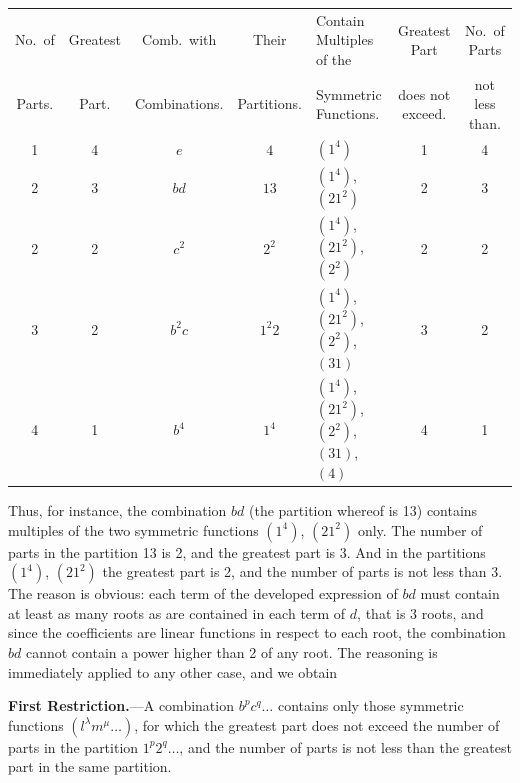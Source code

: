 \documentclass[11pt]{article}
\begin{document}
\medskip

\begin{center}\footnotesize
\begin{tabular}{|c|c|c|c|l|c|c|}
\hline
No.\ of & Greatest & Comb.\ with & Their & Contain Multiples of the & Greatest Part & No.\ of Parts \\
Parts. & Part. & Combinations. & Partitions. & Symmetric Functions. & does not exceed. & not less than. \\
\hline
1 & 4 & $e$     & $4$    & $(1^4)$ & 1 & 4 \\
2 & 3 & $bd$    & $13$   & $(1^4)$, $(21^2)$ & 2 & 3 \\
2 & 2 & $c^2$   & $2^2$  & $(1^4)$, $(21^2)$, $(2^2)$ & 2 & 2 \\
3 & 2 & $b^2 c$ & $1^2 2$& $(1^4)$, $(21^2)$, $(2^2)$, $(31)$ & 3 & 2 \\
4 & 1 & $b^4$   & $1^4$  & $(1^4)$, $(21^2)$, $(2^2)$, $(31)$, $(4)$ & 4 & 1 \\
\hline
\end{tabular}
\end{center}

\medskip

Thus, for instance, the combination $bd$ (the partition whereof is 13) contains multiples of the two symmetric functions $(1^4)$, $(21^2)$ only. The number of parts in the partition 13 is 2, and the greatest part is 3. And in the partitions $(1^4)$, $(21^2)$ the greatest part is 2, and the number of parts is not less than 3. The reason is obvious: each term of the developed expression of $bd$ must contain at least as many roots as are contained in each term of $d$, that is 3 roots, and since the coefficients are linear functions in respect to each root, the combination $bd$ cannot contain a power higher than 2 of any root. The reasoning is immediately applied to any other case, and we obtain

\medskip

\noindent\textbf{First Restriction.}---A combination $b^p c^q\ldots$ contains only those symmetric functions $(l^\lambda m^\mu\ldots)$, for which the greatest part does not exceed the number of parts in the partition $1^p 2^q\ldots$, and the number of parts is not less than the greatest part in the same partition.

\medskip
\end{document}
